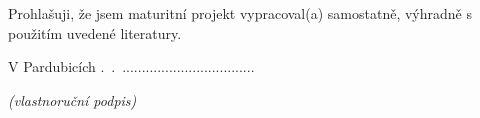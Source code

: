 Prohlašuji, že jsem maturitní projekt vypracoval(a) samostatně, výhradně s použitím uvedené literatury.

V Pardubicích \number\day.~\number\month.~\number\year \hfill ..................................

\hfill \textit{(vlastnoruční podpis)}